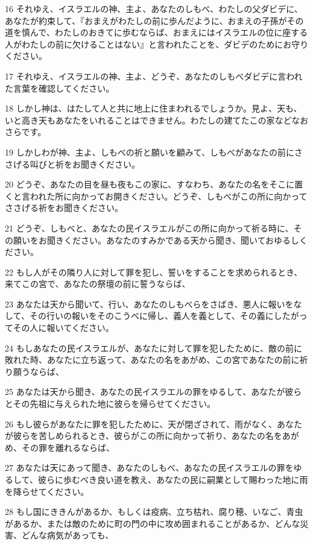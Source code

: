 \par 16 それゆえ、イスラエルの神、主よ、あなたのしもべ、わたしの父ダビデに、あなたが約束して、『おまえがわたしの前に歩んだように、おまえの子孫がその道を慎んで、わたしのおきてに歩むならば、おまえにはイスラエルの位に座する人がわたしの前に欠けることはない』と言われたことを、ダビデのためにお守りください。
\par 17 それゆえ、イスラエルの神、主よ、どうぞ、あなたのしもべダビデに言われた言葉を確認してください。
\par 18 しかし神は、はたして人と共に地上に住まわれるでしょうか。見よ、天も、いと高き天もあなたをいれることはできません。わたしの建てたこの家などなおさらです。
\par 19 しかしわが神、主よ、しもべの祈と願いを顧みて、しもべがあなたの前にささげる叫びと祈をお聞きください。
\par 20 どうぞ、あなたの目を昼も夜もこの家に、すなわち、あなたの名をそこに置くと言われた所に向かってお開きください。どうぞ、しもべがこの所に向かってささげる祈をお聞きください。
\par 21 どうぞ、しもべと、あなたの民イスラエルがこの所に向かって祈る時に、その願いをお聞きください。あなたのすみかである天から聞き、聞いておゆるしください。
\par 22 もし人がその隣り人に対して罪を犯し、誓いをすることを求められるとき、来てこの宮で、あなたの祭壇の前に誓うならば、
\par 23 あなたは天から聞いて、行い、あなたのしもべらをさばき、悪人に報いをなして、その行いの報いをそのこうべに帰し、義人を義として、その義にしたがってその人に報いてください。
\par 24 もしあなたの民イスラエルが、あなたに対して罪を犯したために、敵の前に敗れた時、あなたに立ち返って、あなたの名をあがめ、この宮であなたの前に祈り願うならば、
\par 25 あなたは天から聞き、あなたの民イスラエルの罪をゆるして、あなたが彼らとその先祖に与えられた地に彼らを帰らせてください。
\par 26 もし彼らがあなたに罪を犯したために、天が閉ざされて、雨がなく、あなたが彼らを苦しめられるとき、彼らがこの所に向かって祈り、あなたの名をあがめ、その罪を離れるならば、
\par 27 あなたは天にあって聞き、あなたのしもべ、あなたの民イスラエルの罪をゆるして、彼らに歩むべき良い道を教え、あなたの民に嗣業として賜わった地に雨を降らせてください。
\par 28 もし国にききんがあるか、もしくは疫病、立ち枯れ、腐り穂、いなご、青虫があるか、または敵のために町の門の中に攻め囲まれることがあるか、どんな災害、どんな病気があっても、
